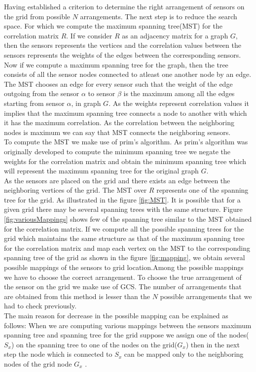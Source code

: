 Having established a criterion to determine the right arrangement of sensors on the grid from  possible ${N}$ arrangements. The next step is to reduce the search space. For which we compute the maximum spanning tree(MST) for the correlation matrix ${R}$. 
If we consider ${R}$ as an adjacency matrix for a graph ${G}$, then the sensors represents the vertices and the correlation values between the sensors represents the weights of the edges between the corresponding sensors.
Now if we compute a maximum spanning tree for the graph, then the tree consists of all the sensor nodes connected to atleast one another node by an edge. The MST chooses an edge for every sensor such that the weight of the edge outgoing from the sensor $\alpha$ to sensor $\beta$ is the maximum among all the edges starting from sensor $\alpha$, in graph ${G}$. As the weights represent correlation values it implies that the maximum spanning tree connects a node to another with which it has the maximum correlation. As the correlation between the neighboring nodes is maximum we can say that MST connects the neighboring sensors.\\
 To compute the MST we make use of prim's algorithm\cite{BLTJ:BLTJ1515}. As prim's algorithm was originally developed to compute the minimum spanning tree we negate the weights for the correlation matrix and obtain the minimum spanning tree which will represent the maximum spanning tree for the original graph ${G}$. \\
As the sensors are placed on the grid and there exists an edge between the neighboring vertices of the grid. The MST over ${R}$ represents one of the spanning tree for the grid. As illustrated in the figure \ref{fig:MST}.
It is possible that for a given grid there may be several spanning trees with the same structure. 
Figure \ref{fig:variousMappings} shows few of the spanning tree similar to the MST obtained for the correlation matrix.
If we compute all the possible spanning trees for the grid which maintains the same structure as that of the maximum spanning tree for the correlation matrix and map each vertex on the MST to the corresponding spanning tree of the grid as shown in the figure \ref{fig:mapping}, we obtain several possible mappings of the sensors to grid location.Among the possible mappings we have to choose the correct arrangement. To choose the true arrangement of the sensor on the grid we make use of  GCS. The number of arrangements that are obtained from this method is lesser than the ${N}$  possible arrangements that we had to check previously. \\
The main reason for decrease in the possible mapping can be explained as follows:
When we are computing various mappings between the sensors maximum spanning tree and spanning tree for the grid suppose we assign one of the nodes($S_x$) on the  spanning tree to one of the nodes on the grid($G_x$) then in the next step the node which is connected to $S_x$ can be mapped only to the neighboring nodes of the grid node $G_x$ .









